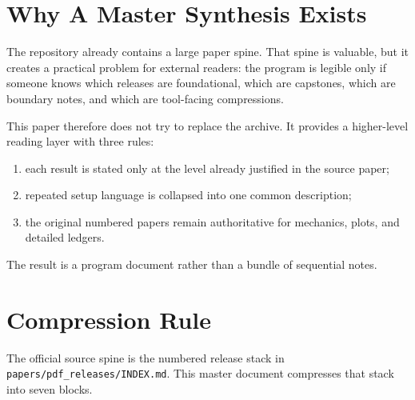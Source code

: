 \documentclass[11pt]{article}
\begin{document}
\section{Why A Master Synthesis Exists}

The repository already contains a large paper spine. That spine is valuable, but it creates a practical problem for external readers: the program is legible only if someone knows which releases are foundational, which are capstones, which are boundary notes, and which are tool-facing compressions.

This paper therefore does not try to replace the archive. It provides a higher-level reading layer with three rules:
\begin{enumerate}
\item each result is stated only at the level already justified in the source paper;
\item repeated setup language is collapsed into one common description;
\item the original numbered papers remain authoritative for mechanics, plots, and detailed ledgers.
\end{enumerate}

The result is a program document rather than a bundle of sequential notes.

\section{Compression Rule}

The official source spine is the numbered release stack in \texttt{papers/pdf\_releases/INDEX.md}. This master document compresses that stack into seven blocks.
\end{document}
